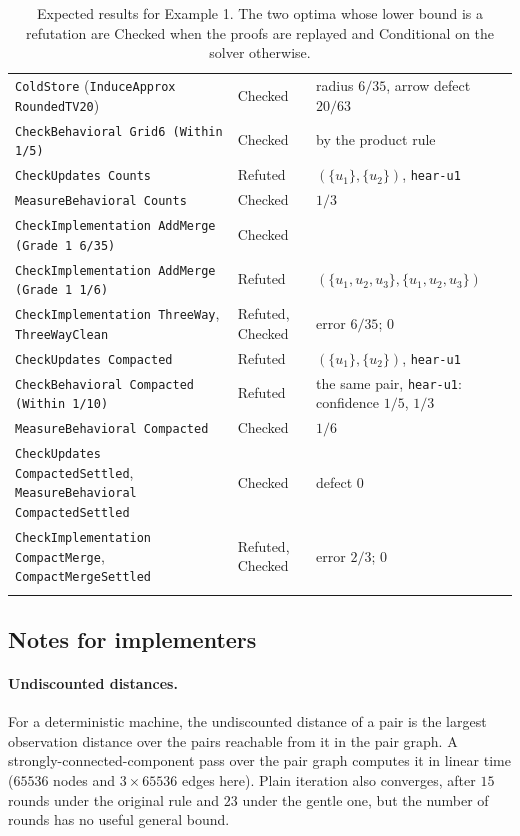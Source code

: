 \documentclass[11pt]{article}
\newcommand{\code}[1]{\texttt{#1}}
\theoremstyle{definition}
\theoremstyle{plain}
\begin{document}
\begin{longtable}{>{\raggedright\arraybackslash}p{6.3cm}l>{\raggedright\arraybackslash}p{5.2cm}}
\code{ColdStore} (\code{InduceApprox RoundedTV20}) & Checked & radius $6/35$, arrow defect $20/63$\\
\code{CheckBehavioral Grid6 (Within 1/5)} & Checked & by the product rule\\
\code{CheckUpdates Counts} & Refuted & $(\{u_1\},\{u_2\})$, \code{hear-u1}\\
\code{MeasureBehavioral Counts} & Checked & $1/3$\\
\code{CheckImplementation AddMerge (Grade 1 6/35)} & Checked & \\
\code{CheckImplementation AddMerge (Grade 1 1/6)} & Refuted & $(\{u_1,u_2,u_3\},\{u_1,u_2,u_3\})$\\
\code{CheckImplementation ThreeWay}, \code{ThreeWayClean} & Refuted, Checked & error $6/35$; $0$\\
\code{CheckUpdates Compacted} & Refuted & $(\{u_1\},\{u_2\})$, \code{hear-u1}\\
\code{CheckBehavioral Compacted (Within 1/10)} & Refuted & the same pair, \code{hear-u1}: confidence $1/5$, $1/3$\\
\code{MeasureBehavioral Compacted} & Checked & $1/6$\\
\code{CheckUpdates CompactedSettled}, \code{MeasureBehavioral CompactedSettled} & Checked & defect $0$\\
\code{CheckImplementation CompactMerge}, \code{CompactMergeSettled} & Refuted, Checked & error $2/3$; $0$\\
\bottomrule
\caption{Expected results for Example 1. The two optima whose lower bound is a refutation are
Checked when the proofs are replayed and Conditional on the solver otherwise.}\label{tab:ex1results}
\end{longtable}

\subsection{Notes for implementers}

\paragraph{Undiscounted distances.} For a deterministic machine, the undiscounted distance of a
pair is the largest observation distance over the pairs reachable from it in the pair graph. A
strongly-connected-component pass over the pair graph computes it in linear time ($65536$ nodes and
$3\times65536$ edges here). Plain iteration also converges, after $15$ rounds under the original rule
and $23$ under the gentle one, but the number of rounds has no useful general bound.
\end{document}
